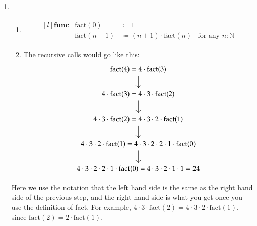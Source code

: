 \documentclass[12pt]{article}
\theoremstyle{definitionstyle}
\def\mbb#1{\mathbb{#1}}
\def\bN{\mbb{N}}
\newcommand{\func}{\mathbf{func}}
\begin{document}
\begin{enumerate}[leftmargin=\labelsep]
        \newpage
        \item \begin{enumerate}
            \item \begin{align*}
                \begin{matrix*}[l]
                    \func &\mathrm{fact}(0) &\coloneqq 1 \\
                    &\mathrm{fact}(n+1) &\coloneqq (n+1) \cdot \mathrm{fact}(n) &\text{for any $n : \bN$}
                \end{matrix*}
            \end{align*}
            \item The recursive calls would go like this:
            \[\begin{tikzcd}
            {\mathrm{fact}(4)= 4 \cdot \mathrm{fact}(3)} \\
            {4 \cdot \mathrm{fact}(3) = 4 \cdot 3 \cdot \mathrm{fact}(2)} \\
            {4 \cdot 3 \cdot \mathrm{fact}(2) = 4 \cdot 3 \cdot 2 \cdot \mathrm{fact}(1)} \\
            {4 \cdot 3 \cdot 2 \cdot \mathrm{fact}(1) = 4 \cdot 3 \cdot 2 \cdot 2 \cdot 1 \cdot \mathrm{fact}(0)} \\
            {4 \cdot 3 \cdot 2 \cdot 2 \cdot 1 \cdot \mathrm{fact}(0) = 4 \cdot 3 \cdot 2 \cdot 1 \cdot 1 = 24}
            \arrow[from=1-1, to=2-1]
            \arrow[from=2-1, to=3-1]
            \arrow[from=3-1, to=4-1]
            \arrow[from=4-1, to=5-1]
            \end{tikzcd}\]
        \end{enumerate}
        Here we use the notation that the left hand side is the same as the right hand side of the previous step, and the right hand side is what you get once you use the definition of fact. For example, $4 \cdot 3 \cdot \mathrm{fact}(2) = 4 \cdot 3 \cdot 2 \cdot \mathrm{fact}(1)$, since $\mathrm{fact}(2) = 2 \cdot \mathrm{fact}(1)$.
        

\end{enumerate}
\end{document}
